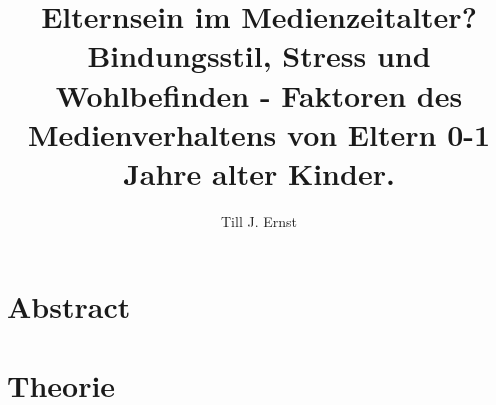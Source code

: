 


\title{Elternsein im Medienzeitalter? \\
Bindungsstil, Stress und Wohlbefinden - Faktoren des Medienverhaltens von Eltern 0-1 Jahre alter Kinder.}
\author{Till J. Ernst}



\makenoidxglossaries %


\RaggedRight





%

\section*{Abstract}\label{sec:Abstract}

\newpage


\setcounter{page}{1}
\setcounter{tocdepth}{3}
\tableofcontents
\newpage

\listoffigures
\newpage

\listoftables
\newpage

\printnoidxglossary[sort=word, title={Abkürzungsverzeichnis}]%
\newpage

\setcounter{page}{1}

\section{Theorie}\label{sec:Theorie}



